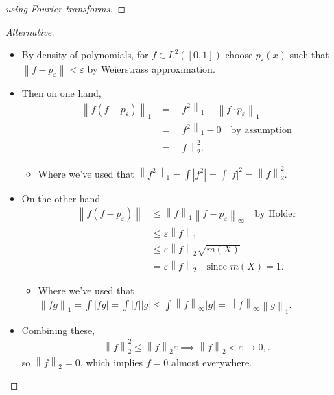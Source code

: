 \begin{solution}
\begin{proof}[using Fourier transforms]
\end{proof}

\begin{proof}[Alternative]

\envlist

\begin{itemize}
\item
  By density of polynomials, for \(f\in L^2([0, 1])\) choose
  \(p_{\varepsilon}(x)\) such that
  \({\left\lVert {f - p_{\varepsilon}} \right\rVert} < {\varepsilon}\)
  by Weierstrass approximation.
\item
  Then on one hand,
  \begin{align*}
  {\left\lVert {f(f-p_{\varepsilon})} \right\rVert}_1 
  &= {\left\lVert {f^2} \right\rVert}_1 - {\left\lVert {f\cdot p_{\varepsilon}} \right\rVert}_1 \\
  &= {\left\lVert {f^2} \right\rVert}_1 - 0 \quad\text{by assumption} \\
  &= {\left\lVert {f} \right\rVert}_2^2
  .\end{align*}

  \begin{itemize}
  \tightlist
  \item
    Where we've used that
    \({\left\lVert {f^2} \right\rVert}_1 = \int {\left\lvert {f^2} \right\rvert} = \int {\left\lvert {f} \right\rvert}^2 = {\left\lVert {f} \right\rVert}_2^2\).
  \end{itemize}
\item
  On the other hand
  \begin{align*}
  {\left\lVert {f(f-p_{\varepsilon})} \right\rVert} 
  &\leq {\left\lVert {f} \right\rVert}_1 {\left\lVert {f-p_{\varepsilon}} \right\rVert}_\infty \quad\text{by Holder} \\
  &\leq {\varepsilon}{\left\lVert {f} \right\rVert}_1  \\
  &\leq {\varepsilon}{\left\lVert {f} \right\rVert}_2 \sqrt{m(X)} \\ 
  &= {\varepsilon}{\left\lVert {f} \right\rVert}_2 \quad\text{since } m(X)= 1
  .\end{align*}

  \begin{itemize}
  \tightlist
  \item
    Where we've used that
    \({\left\lVert {fg} \right\rVert}_1 = \int {\left\lvert {fg} \right\rvert} = \int {\left\lvert {f} \right\rvert}{\left\lvert {g} \right\rvert} \leq \int {\left\lVert {f} \right\rVert}_\infty {\left\lvert {g} \right\rvert} = {\left\lVert {f} \right\rVert}_\infty {\left\lVert {g} \right\rVert}_1\).
  \end{itemize}
\item
  Combining these,
  \begin{align*}
  {\left\lVert {f} \right\rVert}_2^2 \leq {\left\lVert {f} \right\rVert}_2 {\varepsilon}\implies {\left\lVert {f} \right\rVert}_2 < {\varepsilon}\to 0,
  .\end{align*}
  so \({\left\lVert {f} \right\rVert}_2 = 0\), which implies \(f=0\)
  almost everywhere.
\end{itemize}


\end{proof}
\end{solution}
